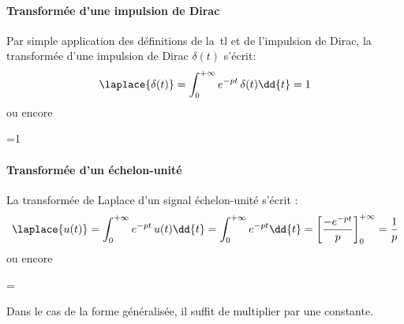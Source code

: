\paragraph{Transformée d'une impulsion de Dirac}
Par simple application des définitions 
de la~\gls{tl} et de l'impulsion de Dirac, la transformée d'une 
impulsion de Dirac $\delta(t)$ s'écrit:
\[
    \laplace{\delta(t)}=\int_{0}^{+\infty} e^{-pt}\,\delta(t)\dd{t}=1
\]
ou encore
\begin{bequation}
    =1
\end{bequation}
\paragraph{Transformée d'un échelon-unité}
La transformée de Laplace d'un signal échelon-unité  s'écrit : 
\[
\laplace{u(t)}=\int_{0}^{+\infty}e^{-pt}\,u(t)\dd{t}
=\int_{0}^{+\infty} e^{-pt}\dd{t}
=\left[\dfrac{-e^{-pt}}{p}\right]_0^{+\infty}=\dfrac{1}{p}
\]
ou encore
\begin{bequation}
    =
\end{bequation}
Dans le cas de la forme généralisée, il suffit de multiplier par une constante.
